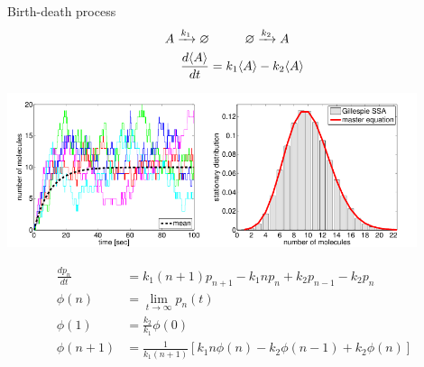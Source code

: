\begin{frame}
Birth-death process \hfill \cite{Erban2007}
{\scriptsize
\begin{align*}
A \xrightarrow{k_1} \varnothing & \hskip 1cm \varnothing \xrightarrow{k_2} A\\
\frac{d \langle A \rangle}{dt} &= k_1 \langle A \rangle - k_2 \langle A \rangle
\end{align*}}
\begin{center}
\includegraphics[width=0.9\textwidth]{fig/stochsimbirthdeathprocess.pdf}\\
\end{center}
{\scriptsize
\begin{align*}
\frac{dp_n}{dt}&=k_1(n+1)p_{n+1} - k_1 n p_n + k_2 p_{n-1} - k_2 p_n\\
\phi(n) &= \lim_{t\rightarrow\infty}p_n(t)\\
\phi(1) &= \frac{k_2}{k_1} \phi(0)\\
\phi(n+1) &= \frac{1}{k_1(n+1)}\left[k_1 n \phi(n) - k_2 \phi(n-1) + k_2 \phi(n) \right]
\end{align*}}
\end{frame}
